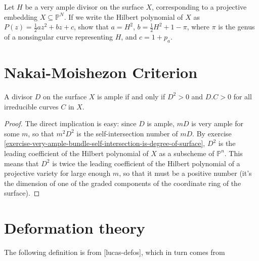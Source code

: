 \begin{exercise}
\label{exercise-very-ample-bundle-self-intersection-is-degree-of-surface}
\begin{reference}
\cite[V, Exercise 1.2]{har}
\end{reference}
Let $H$ be a very ample divisor on the surface $X$, corresponding to a
projective embedding $X\subseteq\mathbb{P}^N$. If we write the Hilbert
polynomial of $X$ as $P(z)=\frac{1}{2}az^2+bz+c$, show that $a=H^2$,
$b=\frac{1}{2}H^2+1-\pi$, where $\pi$ is the genus of a nonsingular curve
representing $H$, and $c=1+p_a$.
\end{exercise}

\section{Nakai-Moishezon Criterion}
\label{section-Nakai-Moishezon-criterion}

\begin{theorem}
\label{theorem-Nakai-Moishezon-criterion}
\begin{reference}
\cite[V, Theorem 1.10]{hart}
\end{reference}
A divisor $D$ on the surface $X$ is ample if and only if $D^2>0$ and $D.C>0$ for
all irreducible curves $C$ in $X$.
\end{theorem}

\begin{proof}
The direct implication is easy: since $D$ is ample,  $mD$ is very ample for some
$m$, so that $m^2D^2$ is the self-intersection number of $mD$. By exercise
\ref{exercise-very-ample-bundle-self-intersection-is-degree-of-surface},
 $D^2$ is the leading coefficient of the Hilbert polynomial of $X$ as a 
subscheme of $\mathbb{P}^n$. This means that $D^2$ is twice the leading
coefficient of the Hilbert polynomial of a projective variety for large enough
$m$, so that it must be a positive number (it's the dimension of one of the
graded components of the coordinate ring of the surface).
\end{proof}

\section{Deformation theory}
\label{section-deformation-theory}

The following definition is from [lucas-defos], which in turn comes from
\cite{Sernesi-deformations}

